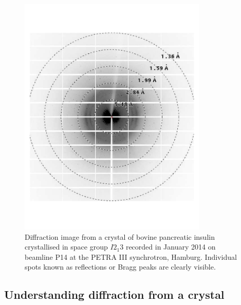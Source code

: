         \begin{figure}
            \centering
            \includegraphics[width=0.8\textwidth]{figures/introduction/InsulinDiffractionImage.pdf}
            \caption[Insulin diffraction image.]{Diffraction image from a crystal of bovine pancreatic insulin crystallised in space group $I2_1 3$ recorded in January 2014 on beamline P14 at the PETRA III synchrotron, Hamburg.
            Individual spots known as reflections or Bragg peaks are clearly visible.}
            \label{fig:Insulin diffraction image}
        \end{figure}
    \subsection{Understanding diffraction from a crystal}
    \label{sub:Understanding diffraction from a crystal}

